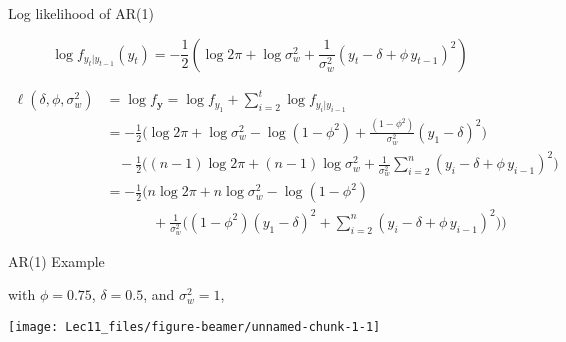 \documentclass[11pt,ignorenonframetext,]{beamer}
\begin{document}
\begin{frame}[t]{Log likelihood of AR(1)}
\protect\hypertarget{log-likelihood-of-ar1}{}

\scriptsize

\[
\log f_{y_{t} | y_{t-1}}(y_t) = -\frac{1}{2}\left( \log 2\pi + \log \sigma^2_w + \frac{1}{\sigma_w^2} (y_t -\delta+\phi\, y_{t-1})^2 \right)
\]

\[
\begin{aligned}
\ell(\delta, \phi, \sigma^2_w) 
  &= \log f_{\symbf{y}} = \log f_{y_1} + \sum_{i=2}^t \log f_{y_{i}|y_{i-1}} \\
  &= - \frac{1}{2} \bigg(\log 2\pi + \log \sigma_w^2 - \log (1-\phi^2) + \frac{(1-\phi^2)}{\sigma_w^2 }(y_1-\delta)^2 \bigg) \\
  & ~~~~ - \frac{1}{2} \bigg( (n-1) \log 2\pi + (n-1) \log \sigma_w^2 + \frac{1}{\sigma_w^2} \sum_{i=2}^n (y_i -\delta+\phi\, y_{i-1})^2 \bigg) \\
  &= - \frac{1}{2} \bigg( n \log 2\pi + n \log \sigma_w^2 - \log (1-\phi^2) \\
  &~~~~~~~~~~~~~~~+ \frac{1}{\sigma_w^2} \bigg( (1-\phi^2)(y_1-\delta)^2 + \sum_{i=2}^n (y_i -\delta+\phi\, y_{i-1})^2 \bigg) \bigg)
\end{aligned}
\]

\end{frame}

\begin{frame}[t]{AR(1) Example}
\protect\hypertarget{ar1-example}{}

with \(\phi = 0.75\), \(\delta=0.5\), and \(\sigma_w^2=1\),

\begin{center}\texttt{[image: Lec11\_files/figure-beamer/unnamed-chunk-1-1]} \end{center}

\end{frame}
\end{document}

